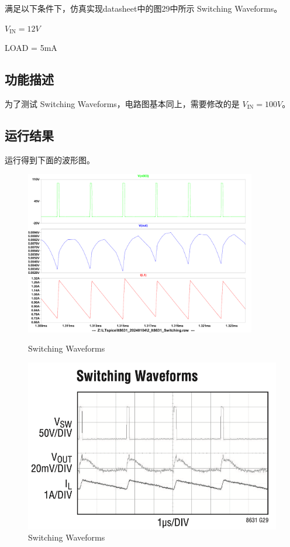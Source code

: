 \documentclass[lang=cn,10pt]{elegantbook}
\begin{document}
满足以下条件下，仿真实现datasheet中的图29中所示 Switching Waveforms。

$V_{\text{IN}} = 12V$

LOAD = 5mA

\subsection{功能描述}

为了测试 Switching Waveforms，电路图基本同上，需要修改的是 $V_{\text{IN}} = 100V$。

\subsection{运行结果}

运行得到下面的波形图。

\begin{figure}[htbp]
    \centering\begin{minipage}[t]{0.48\textwidth}
        \centering\includegraphics[page=1, width=0.9\textwidth]{figure/G29.pdf}
        \caption{Switching Waveforms}
    \end{minipage}
    \centering\begin{minipage}[t]{0.48\textwidth}
        \centering\includegraphics[width=0.9\linewidth]{figure/datasheet_G29.png}
        \caption{Switching Waveforms}
    \end{minipage}
\end{figure}
\end{document}
